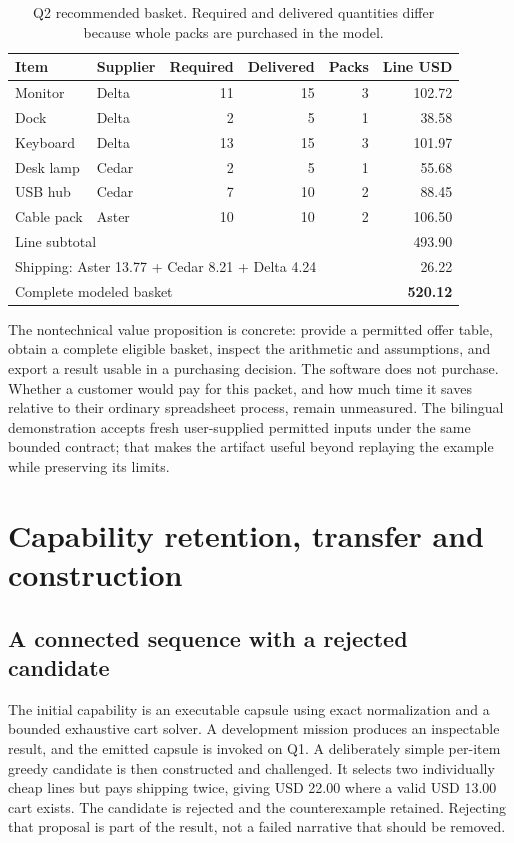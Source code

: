 \begin{table}[htbp]\centering\small
\caption{Q2 recommended basket. Required and delivered quantities differ because whole packs are purchased in the model.}\label{tab:cart}
\begin{tabular}{@{}llrrrr@{}}\toprule
Item & Supplier & Required & Delivered & Packs & Line USD\\\midrule
Monitor & Delta & 11 & 15 & 3 & 102.72\\
Dock & Delta & 2 & 5 & 1 & 38.58\\
Keyboard & Delta & 13 & 15 & 3 & 101.97\\
Desk lamp & Cedar & 2 & 5 & 1 & 55.68\\
USB hub & Cedar & 7 & 10 & 2 & 88.45\\
Cable pack & Aster & 10 & 10 & 2 & 106.50\\\midrule
\multicolumn{5}{l}{Line subtotal} & 493.90\\
\multicolumn{5}{l}{Shipping: Aster 13.77 + Cedar 8.21 + Delta 4.24} & 26.22\\
\multicolumn{5}{l}{Complete modeled basket} & \textbf{520.12}\\\bottomrule
\end{tabular}
\end{table}

The nontechnical value proposition is concrete: provide a permitted offer table, obtain a complete eligible basket, inspect the arithmetic and assumptions, and export a result usable in a purchasing decision. The software does not purchase. Whether a customer would pay for this packet, and how much time it saves relative to their ordinary spreadsheet process, remain unmeasured. The bilingual demonstration accepts fresh user-supplied permitted inputs under the same bounded contract; that makes the artifact useful beyond replaying the example while preserving its limits.

\section{Capability retention, transfer and construction}

\subsection{A connected sequence with a rejected candidate}

The initial capability is an executable capsule using exact normalization and a bounded exhaustive cart solver. A development mission produces an inspectable result, and the emitted capsule is invoked on Q1. A deliberately simple per-item greedy candidate is then constructed and challenged. It selects two individually cheap lines but pays shipping twice, giving USD 22.00 where a valid USD 13.00 cart exists. The candidate is rejected and the counterexample retained. Rejecting that proposal is part of the result, not a failed narrative that should be removed.

